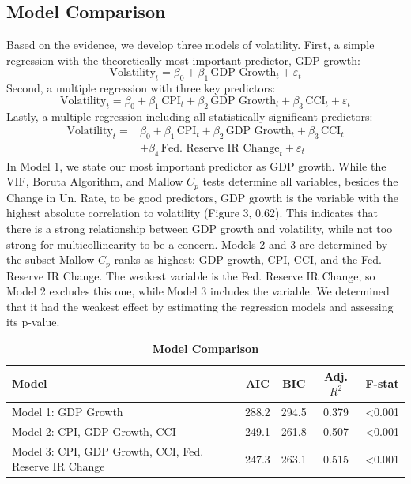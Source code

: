 \subsection{Model Comparison}
Based on the evidence, we develop three models of volatility. First, a simple regression with the theoretically most important predictor, GDP growth:
\begin{equation}
\text{Volatility}_t = \beta_0 + \beta_1 \,\text{GDP Growth}_t + \varepsilon_t
\label{eq:regression1}
\end{equation}
Second, a multiple regression with three key predictors:
\begin{equation}
\text{Volatility}_t = \beta_0 + \beta_1 \,\text{CPI}_t + \beta_2 \,\text{GDP Growth}_t + \beta_3 \,\text{CCI}_t + \varepsilon_t
\label{eq:regression2}
\end{equation}
Lastly, a multiple regression including all statistically significant predictors:
\begin{equation}
\begin{split}
\text{Volatility}_t = {} & \beta_0 + \beta_1 \,\text{CPI}_t + \beta_2 \,\text{GDP Growth}_t + \beta_3 \,\text{CCI}_t \\
& + \beta_4 \,\text{Fed. Reserve IR Change}_t + \varepsilon_t
\end{split}
\label{eq:regression3}
\end{equation}
In Model 1, we state our most important predictor as GDP growth. While the VIF, Boruta Algorithm, and Mallow $C_p$ tests determine all variables, besides the Change in Un. Rate, to be good predictors, GDP growth is the variable with the highest absolute correlation to volatility (Figure 3, 0.62). This indicates that there is a strong relationship between GDP growth and volatility, while not too strong for multicollinearity to be a concern. Models 2 and 3 are determined by the subset Mallow $C_p$ ranks as highest: GDP growth, CPI, CCI, and the Fed. Reserve IR Change. The weakest variable is the Fed. Reserve IR Change, so Model 2 excludes this one, while Model 3 includes the variable. We determined that it had the weakest effect by estimating the regression models and assessing its p-value. 
\vspace{0.8em}
\begin{table}[H]
\centering
\caption{\textbf{Model Comparison}}
\label{tab:model_comparison}
\renewcommand{\arraystretch}{1.4}
\begin{tabularx}{\textwidth}{Xcccc}
\toprule
Model & AIC & BIC & Adj. $R^2$ & F-stat \\
\midrule
Model 1: GDP Growth & 288.2 & 294.5 & 0.379 & <0.001 \\
Model 2: CPI, GDP Growth, CCI & 249.1 & 261.8 & 0.507 & <0.001 \\
Model 3: CPI, GDP Growth, CCI, Fed. Reserve IR Change & 247.3 & 263.1 & 0.515 & <0.001 \\
\bottomrule
\end{tabularx}
\end{table}

